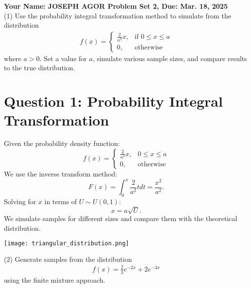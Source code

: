 \documentclass[final,11pt]{article}
\begin{document}
\thispagestyle{empty}
\begin{spacing}{1.25}

\textbf{Your Name:  JOSEPH AGOR  \hfill Problem Set 2, Due: Mar. 18, 2025}\\

(1) Use the probability integral transformation method to simulate from the distribution
\begin{gather}
    f(x) = 
    \begin{cases}
        \frac{2}{a^2}x,  & \text{if }0\leq x\leq a \\
        0, & \text{otherwise}
    \end{cases}
\end{gather}
where $a>0$. Set a value for $a$, simulate various sample sizes, and compare results to the true distribution.


\section*{Question 1: Probability Integral Transformation}
Given the probability density function:
\begin{equation}
 f(x) = \begin{cases}
        \frac{2}{a^2} x, & 0 \leq x \leq a \\
        0, & \text{otherwise}
    \end{cases}
\end{equation}
We use the inverse transform method:
\begin{equation}
    F(x) = \int_0^x \frac{2}{a^2} t dt = \frac{x^2}{a^2}.
\end{equation}
Solving for $x$ in terms of $U \sim U(0,1)$:
\begin{equation}
    x = a \sqrt{U}.
\end{equation}
We simulate samples for different sizes and compare them with the theoretical distribution. 

\begin{center}
    \texttt{[image: triangular\_distribution.png]}
\end{center}

\newpage 

(2) Generate samples from the distribution
\begin{gather}
    f(x)=\frac{2}{3}e^{-2x}+2e^{-3x}
\end{gather}
using the finite mixture approach.



\end{spacing}
\end{document}
